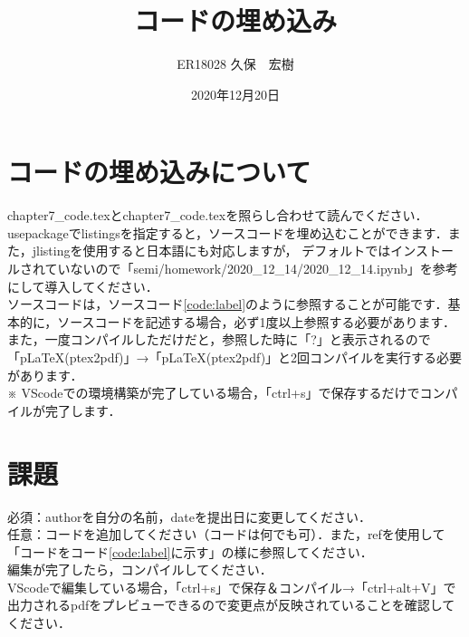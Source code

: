 \documentclass[a4paper,10pt]{jsarticle}
\title{コードの埋め込み}%
\author{ER18028 久保　宏樹}%
\date{2020年12月20日}%
\begin{document}
\maketitle%
\section{コードの埋め込みについて}
chapter7\_code.texとchapter7\_code.texを照らし合わせて読んでください．\\

usepackageでlistingsを指定すると，ソースコードを埋め込むことができます．また，jlistingを使用すると日本語にも対応しますが，
デフォルトではインストールされていないので「semi/homework/2020\_12\_14/2020\_12\_14.ipynb」を参考にして導入してください．\\

ソースコードは，ソースコード\ref{code:label}のように参照することが可能です．基本的に，ソースコードを記述する場合，必ず1度以上参照する必要があります．
また，一度コンパイルしただけだと，参照した時に「?」と表示されるので「pLaTeX(ptex2pdf)」→「pLaTeX(ptex2pdf)」と2回コンパイルを実行する必要があります．\\
※ VScodeでの環境構築が完了している場合，「ctrl+s」で保存するだけでコンパイルが完了します．

\section{課題}
\noindent 必須：authorを自分の名前，dateを提出日に変更してください．\\
任意：コードを追加してください（コードは何でも可）．また，refを使用して「コードをコード\ref{code:label}に示す」の様に参照してください．\\

\noindent 編集が完了したら，コンパイルしてください．\\
VScodeで編集している場合，「ctrl+s」で保存＆コンパイル→「ctrl+alt+V」で出力されるpdfをプレビューできるので変更点が反映されていることを確認してください．\\
\end{document}
